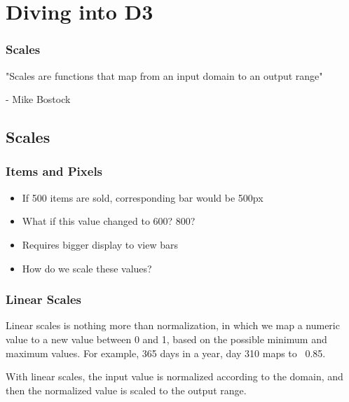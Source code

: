 \documentclass[red]{beamer}
\begin{document}
\begin{frame}
  \titlepage
\end{frame}

\section[Outline]{}

\section{Diving into D3}

\begin{frame}
    \frametitle{Scales}
    "Scales are functions that map from an input domain to an output range"

    \hspace{0.9cm} - Mike Bostock 
\end{frame}


\subsection{Scales}

\begin{frame}
  \frametitle{Items and Pixels}   %
  \lstl

  \begin{itemize}
  \item<1-> If 500 items are sold, corresponding bar would be 500px
  \item<2-> What if this value changed to 600? 800?
  \item<3-> Requires bigger display to view bars
  \item<4-> How do we scale these values?
  \end{itemize}
\end{frame}

\begin{frame}
  \frametitle{Linear Scales}
  Linear scales is nothing more than normalization, in which we map a numeric value to a 
  new value between 0 and 1, based on the possible minimum and maximum values. For example, 
  365 days in a year, day 310 maps to ~0.85. 
  \newline

  With linear scales, the input value is normalized according to the domain, and then the 
  normalized value is scaled to the output range. 
\end{frame}
\end{document}
